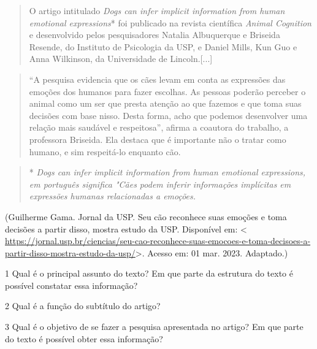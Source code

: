 \begin{quote}
O artigo intitulado \emph{Dogs can infer implicit information from human
emotional expressions}* foi publicado na revista científica \emph{Animal
Cognition} e desenvolvido pelos pesquisadores Natalia Albuquerque e
Briseida Resende, do Instituto de Psicologia da USP, e Daniel Mills, Kun
Guo e Anna Wilkinson, da Universidade de Lincoln.{[}...{]}
\end{quote}

\begin{quote}
``A pesquisa evidencia que os cães levam em conta as expressões das
emoções dos humanos para fazer escolhas. As pessoas poderão perceber o
animal como um ser que presta atenção ao que fazemos e que toma suas
decisões com base nisso. Desta forma, acho que podemos desenvolver uma
relação mais saudável e respeitosa'', afirma a coautora do trabalho, a
professora Briseida. Ela destaca que é importante não o tratar como
humano, e sim respeitá-lo enquanto cão.
\end{quote}

\begin{quote}
* \emph{Dogs can infer implicit information from human emotional
expressions, em português significa "Cães podem inferir informações
implícitas em expressões humanas relacionadas a emoções.}
\end{quote}

(Guilherme Gama. Jornal da USP. Seu cão reconhece suas emoções e toma
decisões a partir disso, mostra estudo da USP. Disponível em:
\textless{}
\url{https://jornal.usp.br/ciencias/seu-cao-reconhece-suas-emocoes-e-toma-decisoes-a-partir-disso-mostra-estudo-da-usp/}\textgreater.
Acesso em: 01 mar. 2023. Adaptado.)

\num{1} Qual é o principal assunto do texto? Em que parte da estrutura
do texto é possível constatar essa informação?


\num{2} Qual é a função do subtítulo do artigo?


\num{3} Qual é o objetivo de se fazer a pesquisa apresentada no artigo?
Em que parte do texto é possível obter essa informação?


